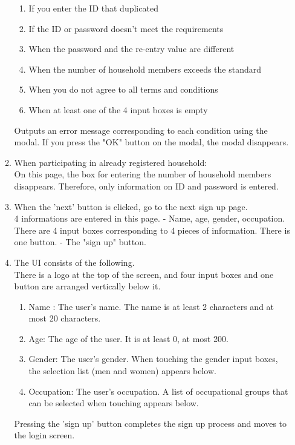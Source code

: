 \documentclass[11pt, conference]{IEEEtran}
\begin{document}
\begin{enumerate}[label=\arabic*]
\begin{enumerate}[label=\alph*]
        \begin{enumerate}
            \item If you enter the ID that duplicated
            \item If the ID or password doesn't meet the requirements
            \item When the password and the re-entry value are different
            \item When the number of household members exceeds the standard
            \item When you do not agree to all terms and conditions
            \item When at least one of the 4 input boxes is empty
        \end{enumerate}
        Outputs an error message corresponding to each condition using the modal. If you press the "OK" button on the modal, the modal disappears.
        \item When participating in already registered household:\\
        On this page, the box for entering the number of household members disappears. Therefore, only information on ID and password is entered.
        \item When the 'next' button is clicked, go to the next sign up page.\\
        4 informations are entered in this page. - Name, age, gender, occupation. There are 4 input boxes corresponding to 4 pieces of information. There is one button. - The "sign up" button.
        \item The UI consists of the following.\\
        There is a logo at the top of the screen, and four input boxes and one button are arranged vertically below it.
        \begin{enumerate}
            \item Name : The user's name. The name is at least 2 characters and at most 20 characters.
            \item Age: The age of the user. It is at least 0, at most 200.
            \item Gender: The user's gender. When touching the gender input boxes, the selection list (men and women) appears below.
            \item Occupation: The user's occupation. A list of occupational groups that can be selected when touching appears below.
        \end{enumerate}
        Pressing the 'sign up' button completes the sign up process and moves to the login screen.

\end{enumerate}
\end{enumerate}
\end{document}
